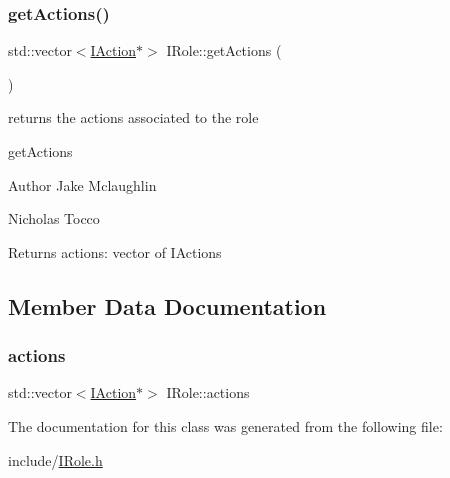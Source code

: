 \subsubsection{\texorpdfstring{get\+Actions()}{getActions()}}
{\footnotesize\ttfamily std\+::vector$<$\mbox{\hyperlink{class_i_action}{I\+Action}}$\ast$$>$ I\+Role\+::get\+Actions (\begin{DoxyParamCaption}{ }\end{DoxyParamCaption})\hspace{0.3cm}{\ttfamily [inline]}}



returns the actions associated to the role 

get\+Actions   \begin{DoxyAuthor}{Author}
Jake Mclaughlin   

Nicholas Tocco 
\end{DoxyAuthor}
\begin{DoxyReturn}{Returns}
actions\+: vector of I\+Actions 
\end{DoxyReturn}


\subsection{Member Data Documentation}
\mbox{\label{class_i_role_a2ce1e0f3b3e449ee8213cb23daf8411e}} 
\subsubsection{\texorpdfstring{actions}{actions}}
{\footnotesize\ttfamily std\+::vector$<$\mbox{\hyperlink{class_i_action}{I\+Action}}$\ast$$>$ I\+Role\+::actions}



The documentation for this class was generated from the following file\+:\begin{DoxyCompactItemize}
\item 
include/\mbox{\hyperlink{_i_role_8h}{I\+Role.\+h}}\end{DoxyCompactItemize}
